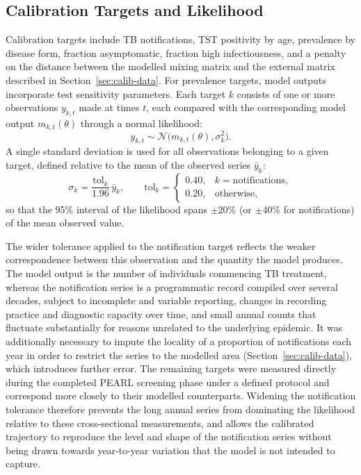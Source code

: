 \documentclass[11pt]{article}
\begin{document}
\subsection{Calibration Targets and Likelihood}

Calibration targets include TB notifications, TST positivity by age, prevalence by disease form, fraction asymptomatic, fraction high infectiousness, and a penalty on the distance between the modelled mixing matrix and the external matrix described in Section~\ref{sec:calib-data}. For prevalence targets, model outputs incorporate test sensitivity parameters. Each target \(k\) consists of one or more observations \(y_{k,t}\) made at times \(t\), each compared with the corresponding model output \(m_{k,t}(\theta)\) through a normal likelihood:
\[
y_{k,t} \sim \mathcal{N}\big(m_{k,t}(\theta), \sigma_k^2\big).
\]
A single standard deviation is used for all observations belonging to a given target, defined relative to the mean of the observed series \(\bar{y}_k\):
\[
\sigma_k = \frac{\mathrm{tol}_k}{1.96}\, \bar{y}_k,
\qquad
\mathrm{tol}_k =
\begin{cases}
0.40, & k = \text{notifications},\\
0.20, & \text{otherwise},
\end{cases}
\]
so that the 95\% interval of the likelihood spans \(\pm 20\%\) (or \(\pm 40\%\) for notifications) of the mean observed value. 

The wider tolerance applied to the notification target reflects the weaker correspondence between this observation and the quantity the model produces. The model output is the number of individuals commencing TB treatment, whereas the notification series is a programmatic record compiled over several decades, subject to incomplete and variable reporting, changes in recording practice and diagnostic capacity over time, and small annual counts that fluctuate substantially for reasons unrelated to the underlying epidemic. It was additionally necessary to impute the locality of a proportion of notifications each year in order to restrict the series to the modelled area (Section~\ref{sec:calib-data}), which introduces further error. The remaining targets were measured directly during the completed PEARL screening phase under a defined protocol and correspond more closely to their modelled counterparts. Widening the notification tolerance therefore prevents the long annual series from dominating the likelihood relative to these cross-sectional measurements, and allows the calibrated trajectory to reproduce the level and shape of the notification series without being drawn towards year-to-year variation that the model is not intended to capture.
\end{document}
